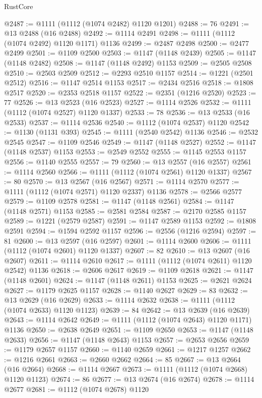 \begin{lexlean}{RustCore}
\begin{coremodule}
@2487 := @1111 (@1112 (@1074 @2482) @1120 @1201)
@2488 := 76
@2491 := @13 @2488 (@16 @2488)
@2492 := @1114 @2491
@2498 := @1111 (@1112 (@1074 @2492) @1120 @1171) @1136
@2499 := @2487 @2498
@2500 := @2477 @2499
@2501 := @1109 @2500
@2503 := @1147 (@1148 @2439)
@2505 := @1147 (@1148 @2482)
@2508 := @1147 (@1148 @2492) @1153
@2509 := @2505 @2508
@2510 := @2503 @2509
@2512 := @2293 @2510 @1157
@2514 := @1221 (@2501 @2512)
@2516 := @1147 @2514 @1153
@2517 := @2434 @2516
@2518 := @1808 @2517
@2520 := @2353 @2518 @1157
@2522 := @2351 (@1216 @2520)
@2523 := 77
@2526 := @13 @2523 (@16 @2523)
@2527 := @1114 @2526
@2532 := @1111 (@1112 (@1074 @2527) @1120 @1337)
@2533 := 78
@2536 := @13 @2533 (@16 @2533)
@2537 := @1114 @2536
@2540 := @1112 (@1074 @2537) @1120
@2542 := @1130 (@1131 @393)
@2545 := @1111 (@2540 @2542) @1136
@2546 := @2532 @2545
@2547 := @1109 @2546
@2549 := @1147 (@1148 @2527)
@2552 := @1147 (@1148 @2537) @1153
@2553 := @2549 @2552
@2555 := @1145 @2553 @1157
@2556 := @1140 @2555
@2557 := 79
@2560 := @13 @2557 (@16 @2557)
@2561 := @1114 @2560
@2566 := @1111 (@1112 (@1074 @2561) @1120 @1337)
@2567 := 80
@2570 := @13 @2567 (@16 @2567)
@2571 := @1114 @2570
@2577 := @1111 (@1112 (@1074 @2571) @1120 @2337) @1136
@2578 := @2566 @2577
@2579 := @1109 @2578
@2581 := @1147 (@1148 @2561)
@2584 := @1147 (@1148 @2571) @1153
@2585 := @2581 @2584
@2587 := @2170 @2585 @1157
@2589 := @1221 (@2579 @2587)
@2591 := @1147 @2589 @1153
@2592 := @1808 @2591
@2594 := @1594 @2592 @1157
@2596 := @2556 (@1216 @2594)
@2597 := 81
@2600 := @13 @2597 (@16 @2597)
@2601 := @1114 @2600
@2606 := @1111 (@1112 (@1074 @2601) @1120 @1337)
@2607 := 82
@2610 := @13 @2607 (@16 @2607)
@2611 := @1114 @2610
@2617 := @1111 (@1112 (@1074 @2611) @1120 @2542) @1136
@2618 := @2606 @2617
@2619 := @1109 @2618
@2621 := @1147 (@1148 @2601)
@2624 := @1147 (@1148 @2611) @1153
@2625 := @2621 @2624
@2627 := @1179 @2625 @1157
@2628 := @1140 @2627
@2629 := 83
@2632 := @13 @2629 (@16 @2629)
@2633 := @1114 @2632
@2638 := @1111 (@1112 (@1074 @2633) @1120 @1123)
@2639 := 84
@2642 := @13 @2639 (@16 @2639)
@2643 := @1114 @2642
@2649 := @1111 (@1112 (@1074 @2643) @1120 @1171) @1136
@2650 := @2638 @2649
@2651 := @1109 @2650
@2653 := @1147 (@1148 @2633)
@2656 := @1147 (@1148 @2643) @1153
@2657 := @2653 @2656
@2659 := @1179 @2657 @1157
@2660 := @1140 @2659
@2661 := @1217 @1257
@2662 := @1216 @2661
@2663 := @2660 @2662
@2664 := 85
@2667 := @13 @2664 (@16 @2664)
@2668 := @1114 @2667
@2673 := @1111 (@1112 (@1074 @2668) @1120 @1123)
@2674 := 86
@2677 := @13 @2674 (@16 @2674)
@2678 := @1114 @2677
@2681 := @1112 (@1074 @2678) @1120

\end{coremodule}
\end{lexlean}
